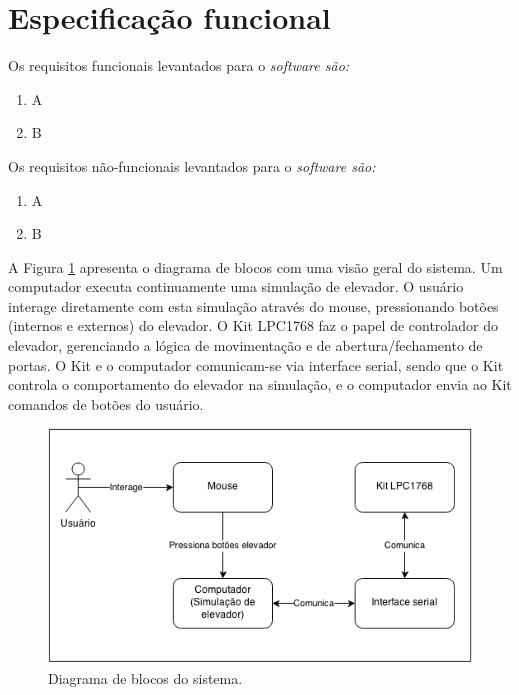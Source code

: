 
\section{Especificação funcional}



Os requisitos funcionais levantados para o \it{software} são:

\begin{enumerate}[label=RF \arabic* -- , ref=\arabic*]
	\item A
	\item B
\end{enumerate}

Os requisitos não-funcionais levantados para o \it{software} são:

\begin{enumerate}[label=RNF \arabic* -- , ref=\arabic*]
	\item A
	\item B
\end{enumerate}


A Figura \ref{fig:diagrama_blocos} apresenta o diagrama de blocos com uma visão geral do sistema. Um computador executa continuamente uma simulação de elevador. O usuário interage diretamente com esta simulação através do mouse, pressionando botões (internos e externos) do elevador. O Kit LPC1768 faz o papel de controlador do elevador, gerenciando a lógica de movimentação e de abertura/fechamento de portas. O Kit e o computador comunicam-se via interface serial, sendo que o Kit controla o comportamento do elevador na simulação, e o computador envia ao Kit comandos de botões do usuário. 


\begin{figure}[h]
\begin{center}
    \includegraphics[width=0.8\columnwidth]{./figures/diagrama_blocos.png}
    \caption{Diagrama de blocos do sistema.}
    \label{fig:diagrama_blocos}
\end{center}
\end{figure}

